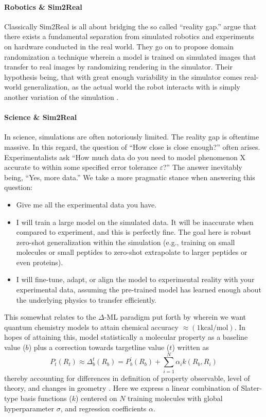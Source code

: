 \documentclass[10pt]{article}
\begin{document}
\paragraph{Robotics \& Sim2Real} Classically Sim2Real is all about bridging the so called ``reality gap.'' \citet{Sim2Real} argue that there exists a fundamental separation from simulated robotics and experiments on hardware conducted in the real world. They go on to propose domain randomization a technique wherein a model is trained on simulated images that transfer to real images by randomizing rendering in the simulator. Their hypothesis being, that with great enough variability in the simulator comes real-world generalization, as the actual world the robot interacts with is simply another variation of the simulation \citep{Sim2Real}.

\paragraph{Science \& Sim2Real} In science, simulations are often notoriously limited. The reality gap is oftentime massive. In this regard, the question of ``How close is close enough?'' often arises. Experimentalists ask ``How much data do you need to model phenomenon X accurate to within some specified error tolerance $\varepsilon$?'' The answer inevitably being, ``Yes, more data.'' We take a more pragmatic stance when answering this question:
\begin{itemize}
    \item [(1)] Give me all the experimental data you have.
    \item [(2)]I will train a large model on the simulated data. It will be inaccurate when compared to experiment, and this is perfectly fine. {The goal here is robust zero-shot generalization within the simulation (e.g., training on small molecules or small peptides to zero-shot extrapolate to larger peptides or even proteins).}
    \item [(3)] I will fine-tune, adapt, or align the model to experimental reality with your experimental data, assuming the pre-trained model has learned enough about the underlying physics to transfer efficiently.
\end{itemize}
This somewhat relates to the $\Delta$-ML paradigm put forth by \citet{deltaMLramakrishnan2015} wherein we want quantum chemistry models to attain chemical accuracy $\approx (1 \text{kcal}/\text{mol})$. In hopes of attaining this, \citet{deltaMLramakrishnan2015} model statistically a molecular property as a baseline value ($b$) plus a correction towards targetline value ($t$) written as
\begin{equation}
P_{t}(R_t) \approx \Delta_{b}^{t}(R_b) = P_{b}^{'}(R_{b}) + \sum_{i=1}^{N} \alpha_i k(R_b, R_i)
\end{equation}
thereby accounting for differences in definition of property observable, level of theory, and changes in geometry \citep{deltaMLramakrishnan2015}. Here we express a linear combination of Slater-type basis functions ($k$) centered on $N$ training molecules with global hyperparameter $\sigma$, and regression coefficients $\alpha$.
\end{document}
